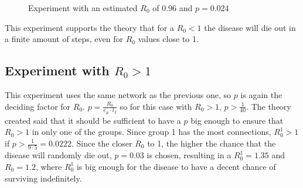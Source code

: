 \begin{figure}
    \centering
    \hfill
    \hfill
    \caption[ Experiment with an estimated $R_0$ of 0.96 and $p = 0.024$ ]
    {\small Experiment with an estimated $R_0$ of 0.96 and $p = 0.024$} 
    \label{fig:exp_r0_small}
\end{figure}



This experiment supports the theory that for a $R_0 < 1$ the disease will die out in a finite amount of steps, even for $R_0$ values close to 1. 

\subsection{Experiment with $R_0 > 1$}
This experiment uses the same network as the previous one, so $p$ is again the deciding factor for $R_0$. $p = \frac{R_0}{e_\mu \cdot t_I}$ so for this case with $R_0 > 1$, $p > \frac{1}{40}$. The theory created said that it should be sufficient to have a $p$ big enough to ensure that $R_0 > 1$ in only one of the groups. Since group 1 has the most connections, $R_0^1 > 1$ if $p > \frac{1}{9\cdot5} = 0.0222$. Since the closer $R_0$ to 1, the higher the chance that the disease will randomly die out, $p=0.03$ is chosen, resulting in a $R_0^1 = 1.35$ and $R_0 = 1.2$, where $R_0^1$ is big enough for the disease to have a decent chance of surviving indefinitely.

